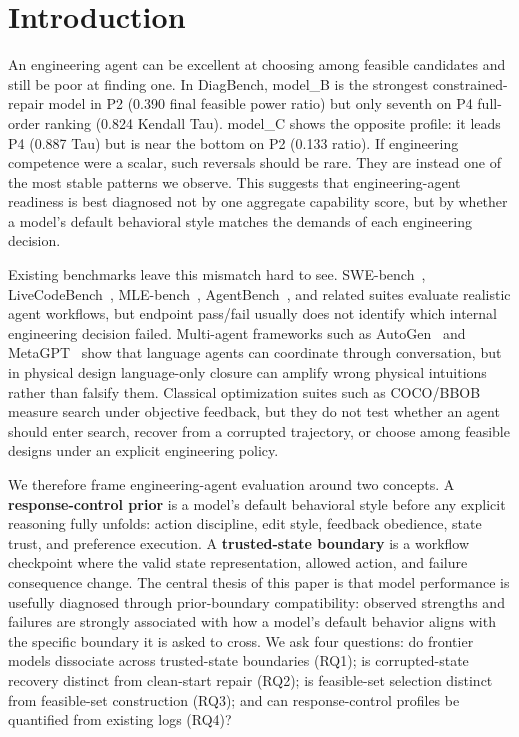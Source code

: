 \section{Introduction}
\label{sec:intro}

An engineering agent can be excellent at choosing among feasible candidates and still be poor at finding one. In DiagBench, model_B is the strongest constrained-repair model in P2 (0.390 final feasible power ratio) but only seventh on P4 full-order ranking (0.824 Kendall Tau). model_C shows the opposite profile: it leads P4 (0.887 Tau) but is near the bottom on P2 (0.133 ratio). If engineering competence were a scalar, such reversals should be rare. They are instead one of the most stable patterns we observe. This suggests that engineering-agent readiness is best diagnosed not by one aggregate capability score, but by whether a model's default behavioral style matches the demands of each engineering decision.

Existing benchmarks leave this mismatch hard to see. SWE-bench~\citep{jimenez2024swebench}, LiveCodeBench~\citep{jain2024livecodebench}, MLE-bench~\citep{chan2025mlebench}, AgentBench~\citep{liu2024agentbench}, and related suites evaluate realistic agent workflows, but endpoint pass/fail usually does not identify which internal engineering decision failed. Multi-agent frameworks such as AutoGen~\citep{wu2023autogen} and MetaGPT~\citep{hong2024metagpt} show that language agents can coordinate through conversation, but in physical design language-only closure can amplify wrong physical intuitions rather than falsify them. Classical optimization suites such as COCO/BBOB~\citep{hansen2021coco} measure search under objective feedback, but they do not test whether an agent should enter search, recover from a corrupted trajectory, or choose among feasible designs under an explicit engineering policy.

We therefore frame engineering-agent evaluation around two concepts. A \textbf{response-control prior} is a model's default behavioral style before any explicit reasoning fully unfolds: action discipline, edit style, feedback obedience, state trust, and preference execution. A \textbf{trusted-state boundary} is a workflow checkpoint where the valid state representation, allowed action, and failure consequence change. The central thesis of this paper is that model performance is usefully diagnosed through prior-boundary compatibility: observed strengths and failures are strongly associated with how a model's default behavior aligns with the specific boundary it is asked to cross. We ask four questions: do frontier models dissociate across trusted-state boundaries (RQ1); is corrupted-state recovery distinct from clean-start repair (RQ2); is feasible-set selection distinct from feasible-set construction (RQ3); and can response-control profiles be quantified from existing logs (RQ4)?

